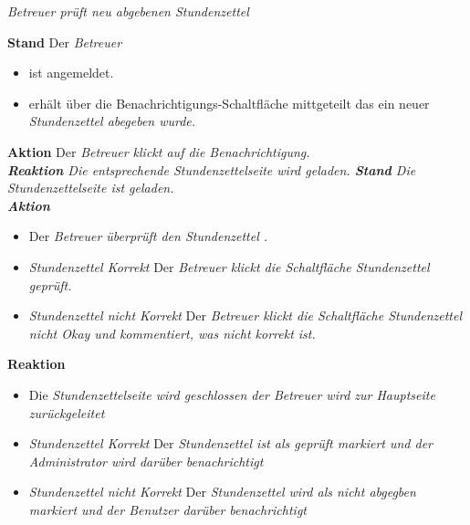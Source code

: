 \begin{requirements}
	 \em Betreuer \em prüft neu \em abgebenen Stundenzettel \em
	\begin{requirements}
	        \textbf{Stand} Der \em Betreuer \em
	            \begin{itemize}
	                \item ist angemeldet.
	                \item erhält über die Benachrichtigungs-Schaltfläche mittgeteilt das ein neuer \em Stundenzettel \em abegeben wurde.
	            \end{itemize}
            \textbf{Aktion} Der \em Betreuer \em klickt auf die Benachrichtigung. \\
            \textbf{Reaktion} Die entsprechende \em Stundenzettelseite \em wird  geladen.
	        \textbf{Stand} Die \em Stundenzettelseite \em ist geladen. \\
            \textbf{Aktion}
                \begin{itemize}
                    \item Der \em Betreuer \em überprüft den \em Stundenzettel \em.
                    \item \textit{Stundenzettel Korrekt} Der \em Betreuer \em klickt die Schaltfläche Stundenzettel geprüft.
                    \item \textit{Stundenzettel nicht Korrekt}  Der \em Betreuer \em klickt die Schaltfläche Stundenzettel nicht Okay und kommentiert, was nicht korrekt ist.
                \end{itemize}
            \textbf{Reaktion}
                \begin{itemize}
                    \item Die \em Stundenzettelseite \em wird geschlossen der \em Betreuer \em wird zur \em Hauptseite \em zurückgeleitet
                    \item \textit{Stundenzettel Korrekt} Der \em Stundenzettel \em ist als \em geprüft \em markiert und der \em Administrator \em wird darüber benachrichtigt
                    \item \textit{Stundenzettel nicht Korrekt} Der \em Stundenzettel \em wird als \em nicht abgegben \em markiert und der \em Benutzer \em darüber benachrichtigt
                \end{itemize}
	\end{requirements}


\end{requirements}
